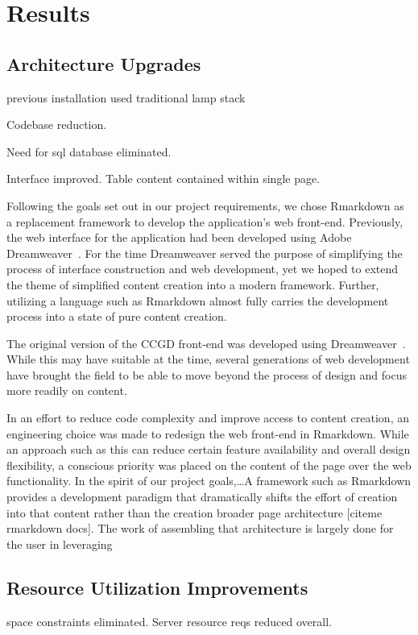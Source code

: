 \documentclass[10pt]{report}
\begin{document}
\section{Results}

\subsection{Architecture Upgrades}
previous installation used traditional lamp stack

Codebase reduction.

Need for sql database eliminated.

Interface improved. Table content contained within single page.

Following the goals set out in our project requirements, we chose Rmarkdown as a replacement framework to develop the application's web front-end. Previously, the web interface for the application had been developed using Adobe Dreamweaver~\cite{Abbott2015}. For the time Dreamweaver served the purpose of simplifying the process of interface construction and web development, yet we hoped to extend the theme of simplified content creation into a modern framework. Further, utilizing a language such as Rmarkdown almost fully carries the development process into a state of pure content creation.

The original version of the CCGD front-end was developed using Dreamweaver~\cite{Abbott2015}. While this may have suitable at the time, several generations of web development have brought the field to be able to move beyond the process of design and focus more readily on content.

In an effort to reduce code complexity and improve access to content creation, an engineering choice was made to redesign the web front-end in Rmarkdown. While an approach such as this can reduce certain feature availability and overall design flexibility, a conscious priority was placed on the content of the page over the web functionality. In the spirit of our project goals,\ldots A framework such as Rmarkdown provides a development paradigm that dramatically shifts the effort of creation into that content rather than the creation broader page architecture [citeme rmarkdown docs]. The work of assembling that architecture is largely done for the user in leveraging

\subsection{Resource Utilization Improvements}
space constraints eliminated. Server resource reqs reduced overall.
\end{document}
